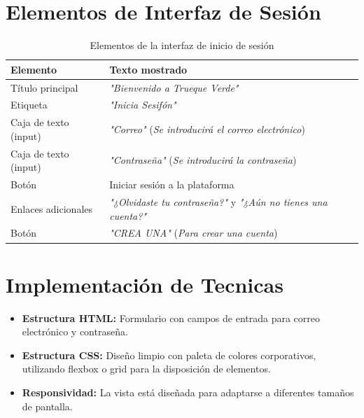 \documentclass[11pt, a4paper, oneside]{book}
\begin{document}
\section{Elementos de Interfaz de Sesión } 
\begin{table}[h]
    \centering
    \renewcommand{\arraystretch}{1.5} 
    \begin{tabular}{|l|l|}
        \hline
        \textbf{Elemento} & \textbf{Texto mostrado} \\ 
        \hline
        Título principal & \textit{"Bienvenido a Trueque Verde"} \\ 
        \hline
        Etiqueta & \textit{"Inicia Sesifón"} \\ 
        \hline
        Caja de texto (input) & \textit{"Correo"} (\textit{Se introducirá el correo electrónico}) \\ 
        \hline
        Caja de texto (input) & \textit{"Contraseña"} (\textit{Se introducirá la contraseña}) \\ 
        \hline
        Botón & Iniciar sesión a la plataforma \\ 
        \hline
        Enlaces adicionales & \textit{"¿Olvidaste tu contraseña?"} y \textit{"¿Aún no tienes una cuenta?"} \\ 
        \hline
        Botón & \textit{"CREA UNA"} (\textit{Para crear una cuenta}) \\ 
        \hline
    \end{tabular}
    \caption{Elementos de la interfaz de inicio de sesión}
    \label{tabla:login}
\end{table}



\section{Implementación de Tecnicas }


\begin{itemize}
\item \textbf { Estructura HTML:}  Formulario con campos de
 entrada para correo electrónico y contraseña.
\item \textbf {Estructura CSS:} Diseño limpio con paleta de colores corporativos, utilizando flexbox o grid para la disposición de elementos.
 \item \textbf { Responsividad:}  La vista está diseñada para
 adaptarse a diferentes tamaños de pantalla.

 
\end{itemize}
\end{document}
